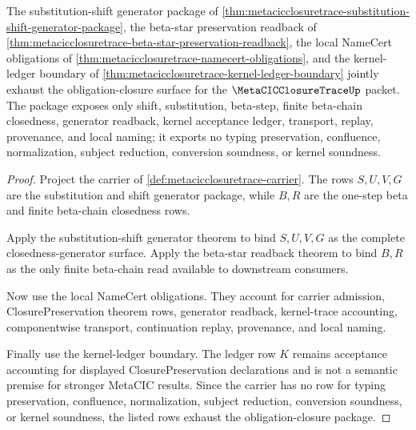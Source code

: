 \begin{theorem}
\label{thm:metacicclosuretrace-obligation-closure-package}
The substitution-shift generator package of \autoref{thm:metacicclosuretrace-substitution-shift-generator-package}, the beta-star preservation readback of \autoref{thm:metacicclosuretrace-beta-star-preservation-readback}, the local NameCert obligations of \autoref{thm:metacicclosuretrace-namecert-obligations}, and the kernel-ledger boundary of \autoref{thm:metacicclosuretrace-kernel-ledger-boundary} jointly exhaust the obligation-closure surface for the $\MetaCICClosureTraceUp$ packet. The package exposes only shift, substitution, beta-step, finite beta-chain closedness, generator readback, kernel acceptance ledger, transport, replay, provenance, and local naming; it exports no typing preservation, confluence, normalization, subject reduction, conversion soundness, or kernel soundness.
\end{theorem}
\begin{proof}
Project the carrier of \autoref{def:metacicclosuretrace-carrier}. The rows $S,U,V,G$ are the substitution and shift generator package, while $B,R$ are the one-step beta and finite beta-chain closedness rows.

Apply the substitution-shift generator theorem to bind $S,U,V,G$ as the complete closedness-generator surface. Apply the beta-star readback theorem to bind $B,R$ as the only finite beta-chain read available to downstream consumers.

Now use the local NameCert obligations. They account for carrier admission, ClosurePreservation theorem rows, generator readback, kernel-trace accounting, componentwise transport, continuation replay, provenance, and local naming.

Finally use the kernel-ledger boundary. The ledger row $K$ remains acceptance accounting for displayed ClosurePreservation declarations and is not a semantic premise for stronger MetaCIC results. Since the carrier has no row for typing preservation, confluence, normalization, subject reduction, conversion soundness, or kernel soundness, the listed rows exhaust the obligation-closure package.
\end{proof}

